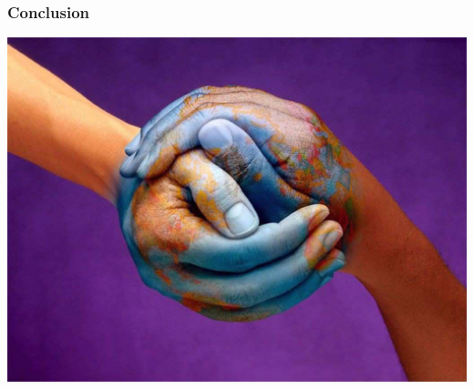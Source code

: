 
\begin{frame}
	\frametitle{Conclusion}
	\begin{center}
	\includegraphics[scale=0.22]{Images/Gk}
	\end{center}
\end{frame}


